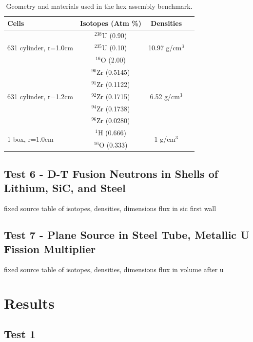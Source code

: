 \documentclass[preprint,12pt]{elsarticle}
\begin{document}
\begin{table}[h]
\centering
\caption{Geometry and materials used in the hex assembly benchmark.}
\label{hex_geom}
\begin{tabular}{| l | c | c | c |}
\hline
Cells & Isotopes (Atm \%)& Densities \\
\hline
\multirow{3}{*}{631 cylinder, r=1.0cm }  &   $^{238}$U   (0.90) &    \multirow{3}{*}{10.97 g/cm$^3$} \\
&  $^{235}$U (0.10)& \\
&  $^{16}$O  (2.00)& \\
\hline
\multirow{5}{*}{631 cylinder, r=1.2cm }  &   $^{90}$Zr   (0.5145) &    \multirow{5}{*}{6.52 g/cm$^3$} \\
&  $^{91}$Zr  (0.1122)& \\
&  $^{92}$Zr  (0.1715)& \\
&  $^{94}$Zr  (0.1738)& \\
&  $^{96}$Zr  (0.0280)& \\
\hline
\multirow{2}{*}{1 box, r=1.0cm }  &   $^{1}$H   (0.666) &    \multirow{2}{*}{1 g/cm$^3$} \\
&  $^{16}$O  (0.333)& \\
\hline
\end{tabular}
\end{table}

\subsection{Test 6 - D-T Fusion Neutrons in Shells of Lithium, SiC, and Steel}

fixed source
table of isotopes, densities, dimensions
flux in sic first wall

\subsection{Test 7 - Plane Source in Steel Tube, Metallic U Fission Multiplier}

fixed source
table of isotopes, densities, dimensions
flux in volume after u


\section{Results}
\label{sec:results}

\subsection{Test 1}
\end{document}
